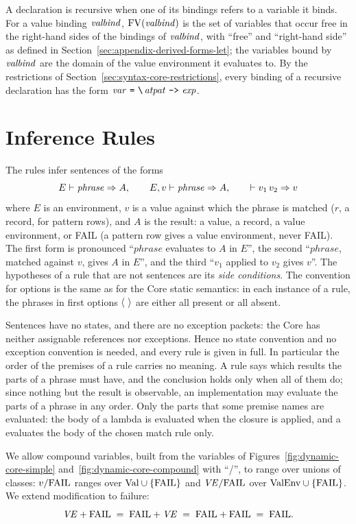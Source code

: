 A declaration is recursive when one of its bindings refers to a variable it
binds. For a value binding $\mathit{valbind}$, $\mathrm{FV}(\mathit{valbind})$ is the set of
variables that occur free in the right-hand sides of the bindings of
$\mathit{valbind}$, with ``free'' and ``right-hand side'' as defined in
Section~\ref{sec:appendix-derived-forms-let}; the variables bound by
$\mathit{valbind}$ are the domain of the value environment it evaluates to. By the
restrictions of Section~\ref{sec:syntax-core-restrictions}, every binding of
a recursive declaration has the form
$\var\ \kw{=}\ \kw{\textbackslash}\,\atpat\ \kw{->}\ \expm$. %

\section{Inference Rules}\label{sec:dynamic-core-rules}

The rules infer sentences of the forms
\[
  E \vdash \mathit{phrase} \Rightarrow A,\qquad
  E, v \vdash \mathit{phrase} \Rightarrow A,\qquad
  \vdash v_1\,v_2 \Rightarrow v
\]
where $E$ is an environment, $v$ is a value against which the
phrase is matched ($r$, a record, for pattern rows), and $A$ is the result: a
value, a record, a value environment, or FAIL (a pattern row gives a value
environment, never FAIL). The first form is pronounced
``$\mathit{phrase}$ evaluates to $A$ in $E$'', the second
``$\mathit{phrase}$, matched against $v$, gives $A$ in $E$'', and the third
``$v_1$ applied to $v_2$ gives $v$''. The hypotheses of a rule that are not
sentences are its \emph{side conditions}. The convention for
options is the same as for the Core static semantics: in each instance of a
rule, the phrases in first options $\langle \ \rangle$ are either all present or all
absent. %

Sentences have no states, and there are no exception packets: the Core has
neither assignable references nor exceptions. Hence no state convention and
no exception convention is needed, and every rule is given in full. %
In particular the order of the premises of a rule carries no meaning. A rule
says which results the parts of a phrase must have, and the conclusion holds
only when all of them do; since nothing but the result is observable, an
implementation may evaluate the parts of a phrase in any order. %
Only the parts that some premise names are evaluated: the body of a lambda is
evaluated when the closure is applied, and a  evaluates the body of
the chosen match rule only.

We allow compound variables, built from the variables of
Figures~\ref{fig:dynamic-core-simple} and~\ref{fig:dynamic-core-compound}
with ``/'', to range over unions of classes: $v/\mathrm{FAIL}$ ranges over
$\mathrm{Val}\cup\mathrm{\{FAIL\}}$ and $\mathit{VE}/\mathrm{FAIL}$ over $\mathrm{ValEnv}\cup\mathrm{\{FAIL\}}$. We extend
modification to failure:
\[
  \mathit{VE}+\mathrm{FAIL} \;=\; \mathrm{FAIL}+\mathit{VE} \;=\; \mathrm{FAIL}+\mathrm{FAIL} \;=\; \mathrm{FAIL} .
\]


